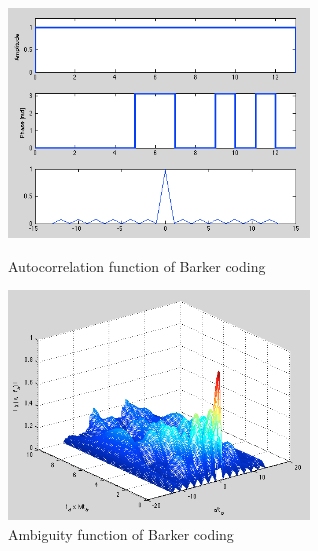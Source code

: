\documentclass{article}
\begin{document}
\begin{figure}[t!]
\begin{minipage}[t]{0.5\linewidth}
\centering
\includegraphics[width=8cm]{Figures/barker_data.png}
\caption{Autocorrelation function of Barker coding}
\label{fig:barker_data}
\end{minipage}
\begin{minipage}[t]{0.5\linewidth}
\centering
\includegraphics[width=8cm]{Figures/barker_3d.png}
\caption{Ambiguity function of Barker coding}
\label{fig:barker_3d}
\end{minipage}
\end{figure}
\end{document}
